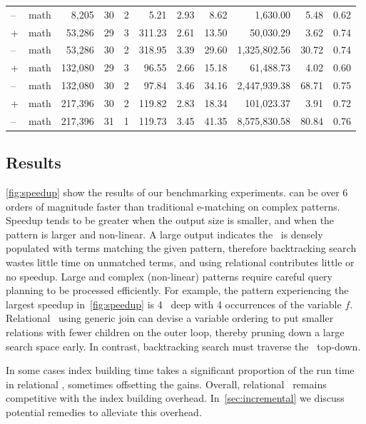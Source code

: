 \begin{table}
\begin{tabular}{|llrrrrrrrrr|}
    --  & math  & 8,205   & 30  & 2   & 5.21   & 2.93  & 8.62  & 1,630.00     & 5.48  & 0.62  \\
    +   & math  & 53,286  & 29  & 3   & 311.23 & 2.61  & 13.50 & 50,030.29    & 3.62  & 0.74  \\
    --  & math  & 53,286  & 30  & 2   & 318.95 & 3.39  & 29.60 & 1,325,802.56 & 30.72 & 0.74  \\
    +   & math  & 132,080 & 29  & 3   & 96.55  & 2.66  & 15.18 & 61,488.73    & 4.02  & 0.60  \\
    --  & math  & 132,080 & 30  & 2   & 97.84  & 3.46  & 34.16 & 2,447,939.38 & 68.71 & 0.75  \\
    +   & math  & 217,396 & 30  & 2   & 119.82 & 2.83  & 18.34 & 101,023.37   & 3.91  & 0.72  \\
    --  & math  & 217,396 & 31  & 1   & 119.73 & 3.45  & 41.35 & 8,575,830.58 & 80.84 & 0.76  \\
    \hline
  \end{tabular}
  \vspace{1em}
  \label{tab:eval}
\end{table}

\subsection{Results}

\autoref{fig:speedup}
 show the results of our benchmarking experiments.
\GJ can be over 6 orders of magnitude faster
 than traditional e-matching on complex patterns.
Speedup tends to be greater when the output size is smaller,
 and when the pattern is larger and non-linear.
A large output indicates the \egraph\ is densely populated
 with terms matching the given pattern,
 therefore backtracking search wastes little time on unmatched terms,
 and using relational \ematching contributes little or no speedup.
Large and complex (non-linear) patterns require careful query planning
 to be processed efficiently.
For example, the pattern experiencing the largest speedup in~\autoref{fig:speedup}
 is 4 \enodes\ deep with 4 occurrences of the variable $f$.
Relational \ematching\ using generic join can devise a variable ordering
 to put smaller relations with fewer children on the outer loop,
 thereby pruning down a large search space early.
In contrast, backtracking search must traverse the \egraph\
 top-down.

In some cases index building time takes a significant proportion of the run time
 in relational \ematching, sometimes offsetting the gains.
Overall, relational \ematching\ remains competitive with the index building overhead.
In~\autoref{sec:incremental} we discuss potential remedies to alleviate this overhead.


